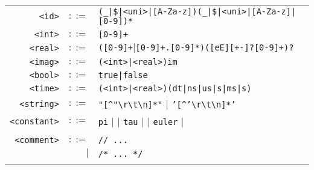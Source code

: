 \documentclass[notitlepage]{article}
\begin{document}
\begin{longtable}{rrl}
	\texttt{<id>} & $::=$ & \texttt{(\_|\$|<uni>|[A-Za-z])(\_|\$|<uni>|[A-Za-z]|[0-9])*} \\
	\texttt{<int>} & $::=$ & \texttt{[0-9]+} \\
	\texttt{<real>} & $::=$ & \texttt{([0-9]+$\mid$[0-9]+.[0-9]*)([eE][+-]?[0-9]+)?} \\
	\texttt{<imag>} & $::=$ & \texttt{(<int>|<real>)im} \\
	\texttt{<bool>} & $::=$ & \texttt{true|false} \\
	\texttt{<time>} & $::=$ & \texttt{(<int>|<real>)(dt|ns|us|{\textmu}s|ms|s)} \\
	\texttt{<string>} & $::=$ & \texttt{"[\string^"{\textbackslash}r{\textbackslash}t{\textbackslash}n]*"} $\mid$ \texttt{'[\string^'{\textbackslash}r{\textbackslash}t{\textbackslash}n]*'} \\
	\texttt{<constant>} & $::=$ & \texttt{pi} $\mid$ \texttt{\textpi} $\mid$ \texttt{tau} $\mid$ \texttt{\texttau} $\mid$ \texttt{euler} $\mid$ \texttt{\textepsilon} \\ \\
	\texttt{<comment>} & $::=$ & \texttt{// ...} \\
	& $\mid$ & \texttt{/* ... */} \\ \\
\end{longtable}
\end{document}
